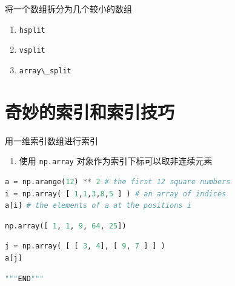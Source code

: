 \documentclass[ignorenonframetext,11pt,xcolor=dvipsnames,hyperref={colorlinks,allcolors=.,urlcolor=blue, citecolor=violet, bookmarksdepth=4},aspectratio=1610]{beamer}
\providecommand{\tightlist}{%
  \setlength{\itemsep}{0pt}\setlength{\parskip}{0pt}}
\newcommand{\passthrough}[1]{#1}
\begin{document}
\begin{frame}[fragile]{将一个数组拆分为几个较小的数组}
\protect\hypertarget{section-18}{}

\begin{enumerate}
\tightlist
\item
  \passthrough{\lstinline!hsplit!}
\item
  \passthrough{\lstinline!vsplit!}
\item
  \passthrough{\lstinline!array\_split!}
\end{enumerate}

\end{frame}

\hypertarget{section-19}{%
\section{奇妙的索引和索引技巧}\label{section-19}}

\begin{frame}[fragile]{用一维索引数组进行索引}
\protect\hypertarget{section-20}{}

\begin{enumerate}
\tightlist
\item
  使用 \passthrough{\lstinline!np.array!}
  对象作为索引下标可以取非连续元素
\end{enumerate}

\begin{lstlisting}[language=Python]
a = np.arange(12) ** 2 # the first 12 square numbers
i = np.array( [ 1,1,3,8,5 ] ) # an array of indices
a[i] # the elements of a at the positions i
\end{lstlisting}

\begin{lstlisting}[language=Python]
np.array([ 1, 1, 9, 64, 25])
\end{lstlisting}

\begin{lstlisting}[language=Python]
j = np.array( [ [ 3, 4], [ 9, 7 ] ] )
a[j]
\end{lstlisting}

\begin{lstlisting}[language=Python]
"""END"""
\end{lstlisting}

\end{frame}
\end{document}
